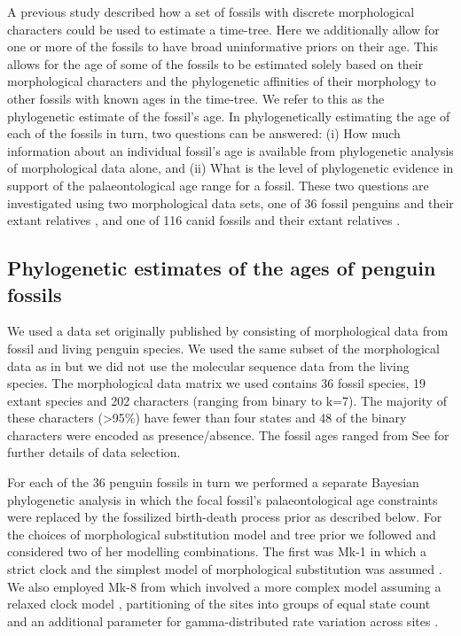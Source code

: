 \documentclass[11pt]{article}
\newcommand{\Mstrict}{{Mk-1}}
\newcommand{\Mrelaxed}{{Mk-8}}
\newcommand{\ncanidfossils}{{116}}
\begin{document}
A previous study described how a set of fossils with discrete morphological characters could be used to estimate a time-tree. 
Here we additionally allow for one or more of the fossils to have broad uninformative priors on their age. 
This allows for the age of some of the fossils to be estimated solely based on their morphological characters and the phylogenetic affinities of their morphology to other fossils with known ages in the time-tree. 
We refer to this as the phylogenetic estimate of the fossil's age. 
In phylogenetically estimating the age of each of the fossils in turn, two questions can be answered: (i) How much information about an individual fossil's age is available from phylogenetic analysis of morphological data alone, and (ii) What is the level of phylogenetic evidence in support of the palaeontological age range for a fossil.
These two questions are investigated using two morphological data sets, one of 36 fossil penguins and their extant relatives \cite{ksepka2010,ksepka2012,gavryushkina2015bayesian}, and one of \ncanidfossils{} canid fossils and their extant relatives \cite{Slater2015}.

\subsection*{Phylogenetic estimates of the ages of penguin fossils}

We used a data set originally published by \cite{ksepka2012} consisting of morphological data from fossil and living penguin 
species. 
We used the same subset of the morphological data as in \cite{gavryushkina2015bayesian} but we did not use the molecular sequence data from the living species. 
The morphological data matrix we used contains 36 fossil species, 19 extant species and 202 characters (ranging from binary to k=7). 
The majority of these characters (\textgreater 95\%) have fewer than four states and 48 of the binary characters were encoded as presence/absence. 
The fossil ages ranged from 
See \cite{gavryushkina2015bayesian} for further details of data selection.

For each of the 36 penguin fossils in turn we performed a separate Bayesian phylogenetic analysis in which the focal fossil's palaeontological age constraints were replaced by 
the fossilized birth-death process prior as described below.  
For the choices of morphological substitution model and tree prior we followed \cite{gavryushkina2015bayesian} and considered two of her modelling combinations. 
The first was \Mstrict{} in which a strict clock and the simplest model of morphological substitution was assumed \cite{Lewis2001}.
We also employed \Mrelaxed{} from \cite{gavryushkina2015bayesian} which involved a more complex model assuming a relaxed clock model \cite{Drummond2006}, partitioning of the sites into groups of equal state count and an additional parameter for gamma-distributed rate variation across sites \cite{yang:1994ma}.
\end{document}
